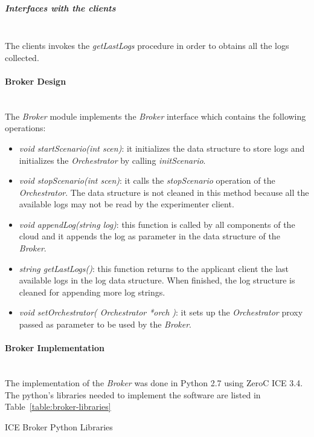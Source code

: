 \subparagraph{Interfaces with the clients}~\\

The clients invokes the \emph{getLastLogs} procedure in order to obtains
all the logs collected.

\paragraph{Broker Design}~\\

The \emph{Broker} module implements the \emph{Broker} interface which
contains the following operations:

\begin{itemize}
\item \emph{void startScenario(int scen)}: it initializes the data structure to
  store logs and initializes the \emph{Orchestrator} by calling \emph{initScenario}.
\item \emph{void stopScenario(int scen)}: it calls the \emph{stopScenario}
  operation of the \emph{Orchestrator}. The data structure is not cleaned in
  this method because all the available logs may not be read by the experimenter
  client.
\item \emph{void appendLog(string log)}: this function is called by all
  components of the  cloud and it appends the log as parameter in the data
  structure of the \emph{Broker}. 
\item \emph{string getLastLogs()}: this function returns to the applicant client
  the last available logs in the log data structure. When finished, the log structure is
  cleaned for appending more log strings.
\item \emph{void setOrchestrator( Orchestrator *orch )}: it sets up the
  \emph{Orchestrator} proxy passed as parameter to be
  used by the \emph{Broker}.
\end{itemize}


\paragraph{Broker Implementation}~\\

The implementation of the \emph{Broker} was done in Python 2.7 using ZeroC ICE 3.4. The
python's libraries needed to implement the software are listed in
Table~\ref{table:broker-libraries}

\begin{table}[hp]
  \centering
  {\small
  
  }
  \caption{ICE Broker Python Libraries}
  \label{table:broker-libraries}
\end{table}


